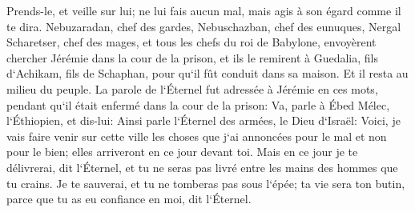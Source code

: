 \verse Prends-le, et veille sur lui; ne lui fais aucun mal, mais agis à son égard comme il te dira. 
\verse Nebuzaradan, chef des gardes, Nebuschazban, chef des eunuques, Nergal Scharetser, chef des mages, et tous les chefs du roi de Babylone, 
\verse envoyèrent chercher Jérémie dans la cour de la prison, et ils le remirent à Guedalia, fils d`Achikam, fils de Schaphan, pour qu`il fût conduit dans sa maison. Et il resta au milieu du peuple. 
\verse La parole de l`Éternel fut adressée à Jérémie en ces mots, pendant qu`il était enfermé dans la cour de la prison: 
\verse Va, parle à Ébed Mélec, l`Éthiopien, et dis-lui: Ainsi parle l`Éternel des armées, le Dieu d`Israël: Voici, je vais faire venir sur cette ville les choses que j`ai annoncées pour le mal et non pour le bien; elles arriveront en ce jour devant toi. 
\verse Mais en ce jour je te délivrerai, dit l`Éternel, et tu ne seras pas livré entre les mains des hommes que tu crains. 
\verse Je te sauverai, et tu ne tomberas pas sous l`épée; ta vie sera ton butin, parce que tu as eu confiance en moi, dit l`Éternel. 

